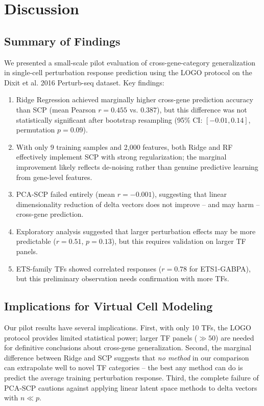 \documentclass[12pt,number,sort&compress]{elsarticle}
\begin{document}
\clearpage

\section{Discussion}
\label{sec:discussion}

\subsection{Summary of Findings}
\label{sec:summary}

We presented a small-scale pilot evaluation of cross-gene-category
generalization in single-cell perturbation response prediction using the
LOGO protocol on the Dixit et al. 2016 Perturb-seq dataset. Key findings:

\begin{enumerate}
  \item Ridge Regression achieved marginally higher cross-gene prediction
        accuracy than SCP (mean Pearson $r = 0.455$ vs. $0.387$), but this
        difference was not statistically significant after bootstrap
        resampling (95\% CI: $[-0.01, 0.14]$, permutation $p = 0.09$).
  \item With only 9 training samples and 2,000 features, both Ridge and RF
        effectively implement SCP with strong regularization; the marginal
        improvement likely reflects de-noising rather than genuine predictive
        learning from gene-level features.
  \item PCA-SCP failed entirely (mean $r = -0.001$), suggesting that linear
        dimensionality reduction of delta vectors does not improve -- and may
        harm -- cross-gene prediction.
  \item Exploratory analysis suggested that larger perturbation effects may
        be more predictable ($r = 0.51$, $p = 0.13$), but this requires
        validation on larger TF panels.
  \item ETS-family TFs showed correlated responses ($r = 0.78$ for ETS1-GABPA),
        but this preliminary observation needs confirmation with more TFs.
\end{enumerate}

\subsection{Implications for Virtual Cell Modeling}
\label{sec:implications}

Our pilot results have several implications. First, with only 10 TFs,
the LOGO protocol provides limited statistical power; larger TF panels
($\gg 50$) are needed for definitive conclusions about cross-gene
generalization. Second, the marginal difference between Ridge and SCP
suggests that \emph{no method} in our comparison can extrapolate well to
novel TF categories -- the best any method can do is predict the average
training perturbation response. Third, the complete failure of PCA-SCP
cautions against applying linear latent space methods to delta vectors
with $n \ll p$.
\end{document}
